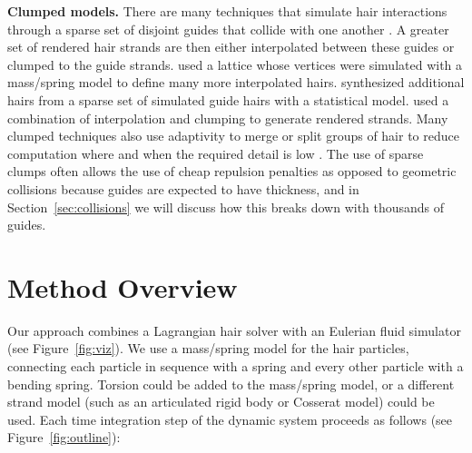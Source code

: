 \noindent\textbf{Clumped models.}  There are many techniques that simulate hair
interactions through a sparse set of disjoint guides that collide with one
another
\cite{bertails:2006:superhelices,hadap:2006:orientedstrands,gupta:2006:real-time-hair,chang:
2002:mutualinteractions}.
A greater set of rendered hair strands are then either interpolated between
these guides or clumped to the guide strands.
\cite{plante:2002:hair-complexity} used a lattice whose vertices were simulated
with a mass/spring model to define many more interpolated
hairs. \cite{choe:2005:simulating-complex-hair} synthesized additional hairs
from a sparse set of simulated guide hairs with a statistical
model. \cite{bertails:2006:superhelices} used a combination of interpolation and
clumping to generate rendered strands.  Many clumped techniques also use
adaptivity to merge or split groups of hair to reduce computation where and when
the required detail is low
\cite{bertails:2003:adaptive-wisp-tree,ward:2003:modeling-hair-lod,ward:2003:adaptive-grouping-
hair}. The
use of sparse clumps often allows the use of cheap repulsion penalties as
opposed to geometric collisions because guides are expected to have
thickness, and in Section~\ref{sec:collisions} we will discuss how this breaks
down with thousands of guides.



\section{Method Overview}

Our approach combines a Lagrangian hair solver with an Eulerian fluid simulator
(see Figure~\ref{fig:viz}).
We use a mass/spring model for the hair particles, connecting each particle in
sequence with a spring and every other particle with a bending spring.  Torsion
could be added to the mass/spring model, or a different strand model (such as an
articulated rigid body or Cosserat model) could be used. Each time integration step of the
dynamic system proceeds as follows (see Figure~\ref{fig:outline}):


